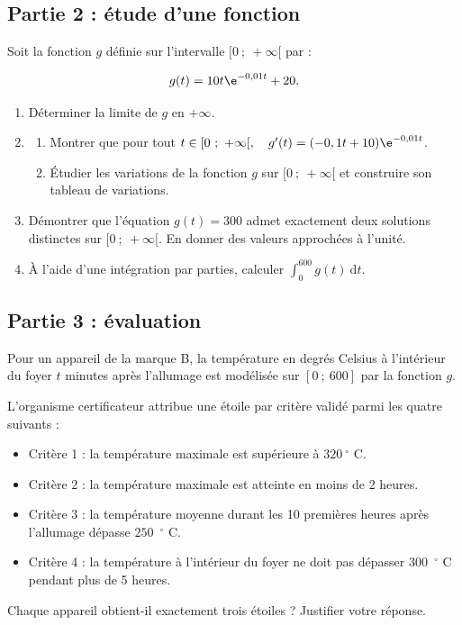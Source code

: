 \subsection*{Partie 2 : étude d'une fonction}
Soit la fonction $g$ définie sur l'intervalle $[0~;~+ \infty[ $ par :

\[g(t) = 10 t \e^{-0,01 t} + 20.\]

\begin{enumerate}
	\item Déterminer la limite de $g$ en $+ \infty$.
	\item \begin{enumerate}
		\item Montrer que pour tout $t \in [0~;~+ \infty[,\quad g'(t)=(-0,1 t + 10) \e^{- 0,01 t}$.
		\item Étudier les variations de la fonction $g$ sur $[0~;~+ \infty[$ et construire son tableau de variations.
	\end{enumerate}
	\item Démontrer que l'équation $g(t) = 300$ admet exactement deux solutions distinctes sur [$0~;~+ \infty[$. En donner des valeurs approchées à l'unité.
	\item À l'aide d'une intégration par parties, calculer \quad $\displaystyle \int_{0}^{600} g(t) \:\text{d}t$.
\end{enumerate}

\subsection*{Partie 3 : évaluation}
Pour un appareil de la marque B, la température en degrés Celsius à l'intérieur du foyer $t$ minutes après l'allumage est modélisée sur $[0~;~600]$ par la fonction $g$.

L'organisme certificateur attribue une étoile par critère validé parmi les quatre suivants :

\begin{itemize}
\item Critère 1 : la température maximale est supérieure à $320~$\ensuremath{^\circ} C.
\item Critère 2 : la température maximale est atteinte en moins de 2 heures.
\item Critère 3 : la température moyenne durant les 10 premières heures après l'allumage dépasse $250$~\ensuremath{^\circ} C.
\item Critère 4 : la température à l'intérieur du foyer ne doit pas dépasser $300$~\ensuremath{^\circ} C pendant plus de 5 heures.
\end{itemize}

Chaque appareil obtient-il exactement trois étoiles ? Justifier votre réponse.
